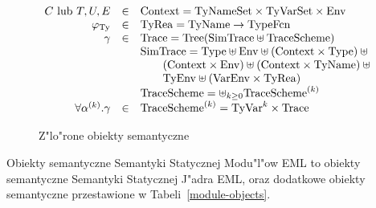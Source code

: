 \begin{figure}
\begin{displaymath}
\begin{array}{rcl}
\C\ {\rm lub}\ \T,\U,\E   & \in   & \Context\index{context!static semantics} =
\TyNameSets\times\TyVarSet\times\Env\\
\tyrea & \in & \TyRea = \TyNames\to\TypeFcn\\
\trace & \in & \Trace = \Tree{\mbox{\SimTrace} \uplus\TraceScheme}\\
&& \SimTrace = \Type\uplus\Env\uplus(\Context\times\Type)\uplus\phantom{\Env}\\
&& \qquad (\Context\times\Env)\uplus(\Context\times\TyNames)\uplus\phantom{\Env}\\
&& \qquad \TyEnv\uplus(\VarEnv\times\TyRea)\\
&& \TraceScheme = \uplus_{k\geq 0} \TraceScheme^{(k)}\\
\forall\alphak.\trace & \in &
\TraceScheme^{(k)}=\mbox{TyVar}^k\times\Trace
\end{array}
\end{displaymath}
\caption{Z"lo"rone obiekty semantyczne}
\label{compound-objects}
\end{figure}

\clearpage

Obiekty semantyczne Semantyki Statycznej Modu"l"ow EML
to obiekty semantyczne Semantyki Statycznej J"adra EML,
oraz dodatkowe obiekty semantyczne przestawione w Tabeli~\ref{module-objects}.

